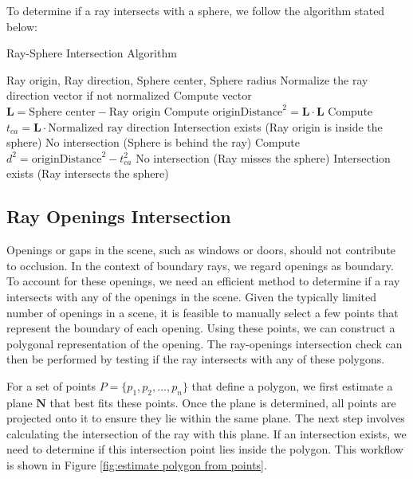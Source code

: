 \documentclass[11pt, a4paper,oneside,chapterprefix=false]{scrbook}
\begin{document}
To determine if a ray intersects with a sphere, we follow the algorithm \cite{scratchapixel2023} stated below:

\begin{algorithm}[H]
\caption{Ray-Sphere Intersection Algorithm}
\begin{algorithmic}[1]
\Require Ray origin, Ray direction, Sphere center, Sphere radius
\State Normalize the ray direction vector if not normalized
\State Compute vector \( \mathbf{L} = \text{Sphere center} - \text{Ray origin} \)
\State Compute \( \text{originDistance}^2 = \mathbf{L} \cdot \mathbf{L} \)
\State Compute \( t_{ca} = \mathbf{L} \cdot \text{Normalized ray direction} \)
    \State \Return Intersection exists (Ray origin is inside the sphere)
\EndIf
{}
    \State \Return No intersection (Sphere is behind the ray)
\EndIf
\State Compute \( d^2 = \text{originDistance}^2 - t_{ca}^2 \)
    \State \Return No intersection (Ray misses the sphere)
\Else
    \State \Return Intersection exists (Ray intersects the sphere)
\EndIf
\end{algorithmic}
\end{algorithm}


\subsection{Ray Openings Intersection}

Openings or gaps in the scene, such as windows or doors, should not contribute to occlusion. In the context of boundary rays, we regard openings as boundary. To account for these openings, we need an efficient method to determine if a ray intersects with any of the openings in the scene. Given the typically limited number of openings in a scene, it is feasible to manually select a few points that represent the boundary of each opening. Using these points, we can construct a polygonal representation of the opening. The ray-openings intersection check can then be performed by testing if the ray intersects with any of these polygons.

\vspace{10pt}

For a set of points \( P = \{p_1, p_2, ..., p_n\} \) that define a polygon, we first estimate a plane \( \mathbf{N} \) that best fits these points. Once the plane is determined, all points are projected onto it to ensure they lie within the same plane. The next step involves calculating the intersection of the ray with this plane. If an intersection exists, we need to determine if this intersection point lies inside the polygon. This workflow is shown in Figure \ref{fig:estimate polygon from points}.
\end{document}
